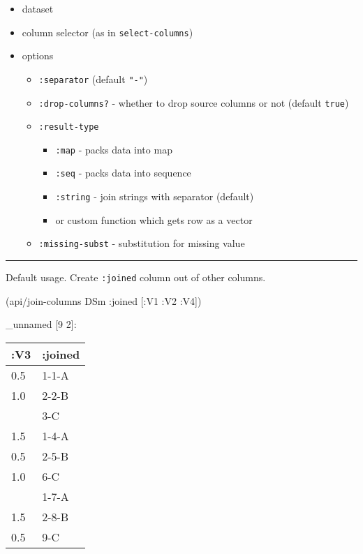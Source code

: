 \documentclass[]{article}
\newenvironment{Shaded}{\begin{snugshade}}{\end{snugshade}}
\newcommand{\AttributeTok}[1]{\textcolor[rgb]{0.77,0.63,0.00}{#1}}
\newcommand{\NormalTok}[1]{#1}
\providecommand{\tightlist}{%
  \setlength{\itemsep}{0pt}\setlength{\parskip}{0pt}}
\begin{document}
\begin{itemize}
\tightlist
\item
  dataset
\item
  column selector (as in \texttt{select-columns})
\item
  options

  \begin{itemize}
  \tightlist
  \item
    \texttt{:separator} (default \texttt{"-"})
  \item
    \texttt{:drop-columns?} - whether to drop source columns or not
    (default \texttt{true})
  \item
    \texttt{:result-type}

    \begin{itemize}
    \tightlist
    \item
      \texttt{:map} - packs data into map
    \item
      \texttt{:seq} - packs data into sequence
    \item
      \texttt{:string} - join strings with separator (default)
    \item
      or custom function which gets row as a vector
    \end{itemize}
  \item
    \texttt{:missing-subst} - substitution for missing value
  \end{itemize}
\end{itemize}

\begin{center}\rule{0.5\linewidth}{0.5pt}\end{center}

Default usage. Create \texttt{:joined} column out of other columns.

\begin{Shaded}
\begin{Highlighting}[]
\NormalTok{(api/join-columns DSm }\AttributeTok{:joined}\NormalTok{ [}\AttributeTok{:V1} \AttributeTok{:V2} \AttributeTok{:V4}\NormalTok{])}
\end{Highlighting}
\end{Shaded}

\_unnamed {[}9 2{]}:

\begin{longtable}[]{@{}ll@{}}
\toprule
:V3 & :joined\tabularnewline
\midrule
\endhead
0.5 & 1-1-A\tabularnewline
1.0 & 2-2-B\tabularnewline
& 3-C\tabularnewline
1.5 & 1-4-A\tabularnewline
0.5 & 2-5-B\tabularnewline
1.0 & 6-C\tabularnewline
& 1-7-A\tabularnewline
1.5 & 2-8-B\tabularnewline
0.5 & 9-C\tabularnewline
\bottomrule
\end{longtable}
\end{document}
